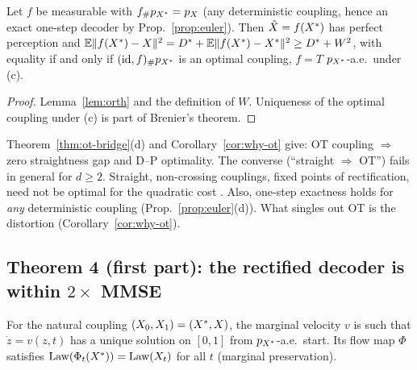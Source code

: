 \begin{corollary}\label{cor:why-ot}
Let $f$ be measurable with $f_\#p_{X^{*}}=p_X$ (any deterministic coupling, hence an exact one-step decoder by Prop.~\ref{prop:euler}). Then $\hat X=f(X^{*})$ has perfect perception and
$\mathbb{E}\|f(X^{*})-X\|^2=D^{*}+\mathbb{E}\|f(X^{*})-X^{*}\|^2\ge D^{*}+W^2$,
with equality if and only if $(\mathrm{id},f)_\#p_{X^{*}}$ is an optimal coupling, \ie $f=T$ $p_{X^{*}}$-a.e.\ under (c).
\end{corollary}
\begin{proof}
Lemma~\ref{lem:orth} and the definition of $W$. Uniqueness of the optimal coupling under (c) is part of Brenier's theorem.
\end{proof}

\begin{remark}\label{rem:straight}
Theorem~\ref{thm:ot-bridge}(d) and Corollary~\ref{cor:why-ot} give: OT coupling $\Rightarrow$ zero straightness gap and D--P optimality. The converse (``straight $\Rightarrow$ OT'') fails in general for $d\ge2$. Straight, non-crossing couplings, \eg fixed points of rectification, need not be optimal for the quadratic cost \cite{liu2023flow}.
Also, one-step exactness holds for \emph{any} deterministic coupling (Prop.~\ref{prop:euler}(d)). What singles out OT is the distortion (Corollary~\ref{cor:why-ot}).
\end{remark}

\subsection{Theorem 4 (first part): the rectified decoder is within $2\times$ MMSE}

\begin{assumption}\label{ass:rf}
For the natural coupling $(X_0,X_1)=(X^{*},X)$, the marginal velocity $v$ is such that $\dot z=v(z,t)$ has a unique solution on $[0,1]$ from $p_{X^{*}}$-a.e.\ start. Its flow map $\Phi$ satisfies $\mathrm{Law}(\Phi_t(X^{*}))=\mathrm{Law}(X_t)$ for all $t$ (marginal preservation).
\end{assumption}

